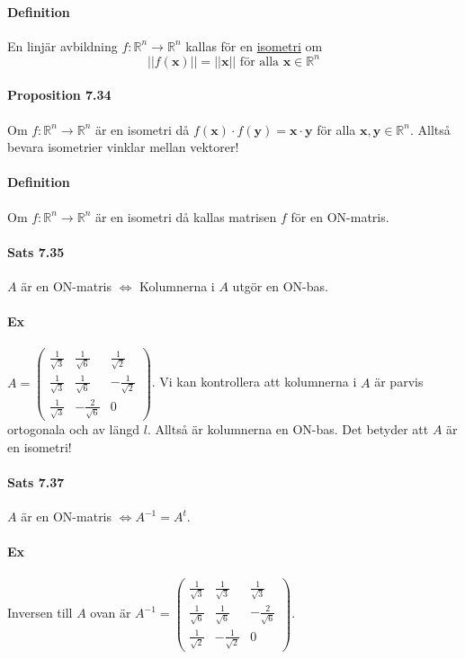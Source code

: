 \paragraph{Definition} En linjär avbildning $f:\mathbb{R}^n\rightarrow\mathbb{R}^n$ kallas för en \underline{isometri} om
\begin{equation*}
    ||f(\bm{x})|| = ||\bm{x}||\text{ för alla }\bm{x}\in\mathbb{R}^n
\end{equation*}

\paragraph{Proposition 7.34} Om $f:\mathbb{R}^n\rightarrow\mathbb{R}^n$ är en isometri då $f(\bm{x})\cdot f(\bm{y})=\bm{x}\cdot\bm{y}$ för alla $\bm{x},\bm{y}\in\mathbb{R}^n$.
Alltså bevara isometrier vinklar mellan vektorer!

\paragraph{Definition} Om $f:\mathbb{R}^n\rightarrow\mathbb{R}^n$ är en isometri då kallas matrisen $f$ för en  ON-matris.

\paragraph{Sats 7.35} $A$ är en  ON-matris $\Leftrightarrow$ Kolumnerna i $A$ utgör en ON-bas.

\paragraph{Ex} $A=\begin{pmatrix}
    \frac{1}{\sqrt{3}}&\frac{1}{\sqrt{6}}&\frac{1}{\sqrt{2}}\\
    \frac{1}{\sqrt{3}}&\frac{1}{\sqrt{6}}&-\frac{1}{\sqrt{2}}\\
    \frac{1}{\sqrt{3}}&-\frac{2}{\sqrt{6}}&0
\end{pmatrix}$.
Vi kan kontrollera att kolumnerna i $A$ är parvis ortogonala och av längd $l$.
Alltså är kolumnerna en ON-bas.
Det betyder att $A$ är en isometri!

\paragraph{Sats 7.37} $A$ är en ON-matris $\Leftrightarrow A^{-1}=A^{t}$.

\paragraph{Ex} Inversen till $A$ ovan är $A^{-1}=\begin{pmatrix}
    \frac{1}{\sqrt{3}}&\frac{1}{\sqrt{3}}&\frac{1}{\sqrt{3}}\\
    \frac{1}{\sqrt{6}}&\frac{1}{\sqrt{6}}&-\frac{2}{\sqrt{6}}\\
    \frac{1}{\sqrt{2}}&-\frac{1}{\sqrt{2}}&0
\end{pmatrix}$.

